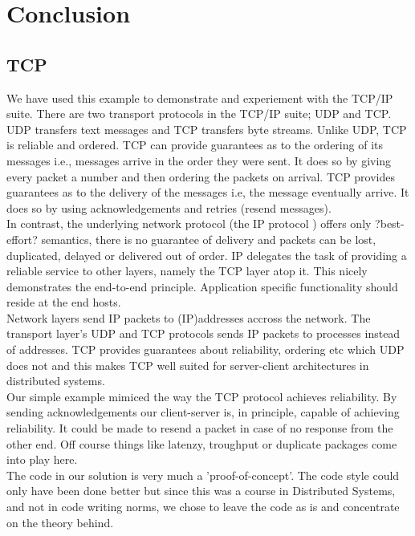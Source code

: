 \chapter{Conclusion}
\minitoc
\section{TCP}

We have used this example to demonstrate and experiement with the TCP/IP suite. There are two transport protocols in the TCP/IP suite; UDP and TCP. UDP transfers text messages and TCP transfers byte streams. Unlike UDP, TCP is reliable and ordered. TCP can provide guarantees as to the ordering of its messages i.e., messages arrive in the order they were sent. It does so by giving every packet a number and then ordering the packets on arrival. TCP provides guarantees as to the delivery of the messages i.e, the message eventually arrive. It does so by using acknowledgements and retries (resend messages).   \\

In contrast, the underlying network protocol (the IP protocol ) offers only ?best-effort? semantics, there is no guarantee of delivery and packets can be lost, duplicated, delayed or delivered out of order. IP delegates the task of providing a reliable service to other layers, namely the TCP layer atop it. This nicely demonstrates the end-to-end principle. Application specific functionality should reside at the end hosts.\\

Network layers send IP packets to (IP)addresses accross the network. The transport layer's UDP and TCP protocols sends IP packets to processes instead of addresses. TCP provides guarantees about reliability, ordering etc which UDP does not and this makes TCP well suited for server-client architectures in distributed systems. \\

Our simple example mimiced the way the TCP protocol achieves reliability. By sending acknowledgements our client-server is, in principle, capable of achieving reliability. It could be made to resend a packet in case of no response from the other end. Off course things like latenzy, troughput or duplicate packages come into play here. \\

The code in our solution is very much a 'proof-of-concept'. The code style could only have been done better but since this was a course in Distributed Systems, and not in code writing norms, we chose to leave the code as is and concentrate on the theory behind.  \\


